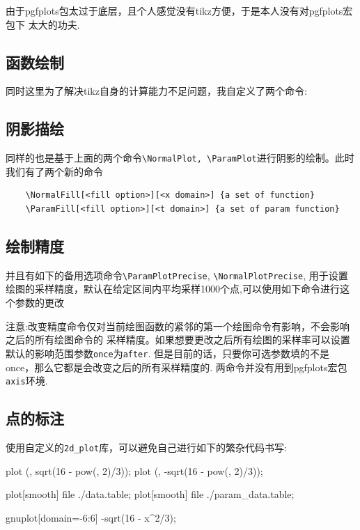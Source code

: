 \documentclass[12pt]{article}
\begin{document}
由于pgfplots包太过于底层，且个人感觉没有tikz方便，于是本人没有对pgfplots宏包下
太大的功夫.

\subsection{函数绘制}
同时这里为了解决tikz自身的计算能力不足问题，我自定义了两个命令:
\begin{codeprint}
\end{codeprint}


\subsection{阴影描绘}
同样的也是基于上面的两个命令\verb|\NormalPlot, \ParamPlot|进行阴影的绘制。此时我们有了两个新的命令
\begin{verbatim}
    \NormalFill[<fill option>][<x domain>] {a set of function}
    \ParamFill[<fill option>][<t domain>] {a set of param function}
\end{verbatim}


\subsection{绘制精度}
并且有如下的备用选项命令\verb|\ParamPlotPrecise|, \verb|\NormalPlotPrecise|, 用于设置
绘图的采样精度，默认在给定区间内平均采样1000个点,可以使用如下命令进行这个参数的更改
\begin{codeprint}
\end{codeprint}

注意:改变精度命令仅对当前绘图函数的紧邻的第一个绘图命令有影响，不会影响之后的所有绘图命令的
采样精度。如果想要更改之后所有绘图的采样率可以设置默认的影响范围参数\verb|once|为\verb|after|.
但是目前的话，只要你可选参数填的不是once，那么它都是会改变之后的所有采样精度的.
两命令并没有用到pgfplots宏包\verb|axis|环境.


\subsection{点的标注}
使用自定义的\verb|2d_plot|库，可以避免自己进行如下的繁杂代码书写:
\begin{codeprint}
\draw[smooth, purple, domain=-6.927:6.927] plot (\x, {sqrt(16 - pow(\x, 2)/3)});
\draw[smooth, purple, domain=-6.927:6.927] plot (\x, -{sqrt(16 - pow(\x, 2)/3)});

\draw plot[smooth] file {./data.table};
\draw[red] plot[smooth] file {./param_data.table};

\begin{axis}               
    \addplot gnuplot[domain=-6:6] {-sqrt(16 - x^2/3)};                
\end{axis} 
\end{codeprint}
\end{document}
